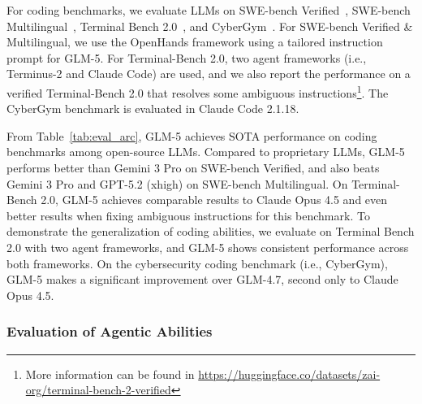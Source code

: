 For coding benchmarks, we evaluate LLMs on SWE-bench Verified~\cite{jimenez2023swe}, SWE-bench Multilingual~\cite{yang2025swemulti}, Terminal Bench 2.0~\cite{tbench_2025}, and CyberGym~\cite{wang2025cybergym}. 
For SWE-bench Verified \& Multilingual, we use the OpenHands framework using a tailored instruction prompt for GLM-5. 
For Terminal-Bench 2.0, two agent frameworks (i.e., Terminus-2 and Claude Code) are used, and we also report the performance on a verified Terminal-Bench 2.0 that resolves some ambiguous instructions\footnote{More information can be found in \url{https://huggingface.co/datasets/zai-org/terminal-bench-2-verified}}. 
The CyberGym benchmark is evaluated in Claude Code 2.1.18.

From Table~\ref{tab:eval_arc}, GLM-5 achieves SOTA performance on coding benchmarks among open-source LLMs. 
Compared to proprietary LLMs, GLM-5 performs better than Gemini 3 Pro on SWE-bench Verified, and also beats Gemini 3 Pro and GPT-5.2 (xhigh) on SWE-bench Multilingual. 
On Terminal-Bench 2.0, GLM-5 achieves comparable results to Claude Opus 4.5 and even better results when fixing ambiguous instructions for this benchmark. 
To demonstrate the generalization of coding abilities, we evaluate on Terminal Bench 2.0 with two agent frameworks, and GLM-5 shows consistent performance across both frameworks. 
On the cybersecurity coding benchmark (i.e., CyberGym), GLM-5 makes a significant improvement over GLM-4.7, second only to Claude Opus 4.5. 


\subsubsection{Evaluation of Agentic Abilities}


